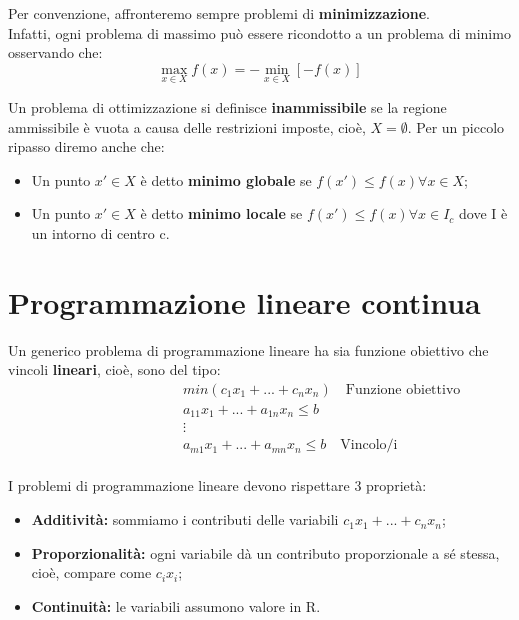Per convenzione, affronteremo sempre problemi di \textbf{minimizzazione}. \\
Infatti, ogni problema di massimo può essere ricondotto a un problema di minimo osservando che:
\[\max_{x \in X} f(x) = -\min_{x \in X} [-f(x)]\]

Un problema di ottimizzazione si definisce \textbf{inammissibile} se la regione ammissibile è vuota a causa delle restrizioni imposte, cioè, $X = \emptyset$.
Per un piccolo ripasso diremo anche che:
\begin{itemize}
    \item Un punto $x'\in X$ è detto \textbf{minimo globale} se $f(x')\leq f(x) \forall x\in X$;
    \item Un punto $x'\in X$ è detto \textbf{minimo locale} se $f(x')\leq f(x) \forall x\in I_c$ dove I è un intorno di centro c.
\end{itemize}

\chapter{Programmazione lineare continua}
Un generico problema di programmazione lineare ha sia funzione obiettivo che vincoli \textbf{lineari}, cioè, sono del tipo:
\begin{align*}
    &min(c_1x_1+...+c_nx_n) \quad \text{Funzione obiettivo}\\
    &a_{11}x_1+...+a_{1n}x_n \leq b \quad \\
    \quad\quad\quad\quad\quad\quad\quad\quad &\vdots \\
    &a_{m1}x_1+...+a_{mn}x_n \leq b \quad \text{Vincolo/i} \\
\end{align*}

I problemi di programmazione lineare devono rispettare 3 proprietà:
\begin{itemize}
    \item \textbf{Additività:} sommiamo i contributi delle variabili $c_1x_1+...+c_nx_n$;
    \item \textbf{Proporzionalità:} ogni variabile dà un contributo proporzionale a sé stessa, cioè, compare come $c_ix_i$;
    \item \textbf{Continuità:} le variabili assumono valore in R.
\end{itemize}

